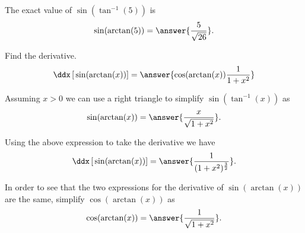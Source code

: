 \documentclass{ximera}
\author{Nela Lakos \and Kyle Parsons}
\begin{document}
\begin{exercise}

The exact value of $\sin(\tan^{-1}(5))$ is
\[
\sin(\arctan(5)) = \answer{\frac{5}{\sqrt{26}}}.
\]

Find the derivative.
\[
\ddx\left[\vphantom{\ddx}\sin(\arctan(x))\right] = \answer{\cos(\arctan(x))\frac{1}{1+x^2}}
\]

Assuming $x>0$ we can use a right triangle to simplify $\sin(\tan^{-1}(x))$ as
\[
\sin(\arctan(x)) = \answer{\frac{x}{\sqrt{1+x^2}}}.
\]

Using the above expression to take the derivative we have
\[
\ddx\left[\vphantom{\ddx}\sin(\arctan(x))\right] = \answer{\frac{1}{(1+x^2)^{\frac{3}{2}}}}.
\]

In order to see that the two expressions for the derivative of $\sin(\arctan(x))$ are the same, simplify $\cos(\arctan(x))$ as
\[
\cos(\arctan(x)) = \answer{\frac{1}{\sqrt{1+x^2}}}.
\]

\end{exercise}
\end{document}
